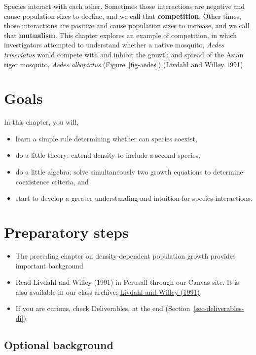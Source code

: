 \documentclass[
  letterpaper,
  DIV=11,
  numbers=noendperiod]{scrreprt}
\providecommand{\tightlist}{%
  \setlength{\itemsep}{0pt}\setlength{\parskip}{0pt}}
\begin{document}
Species interact with each other. Sometimes those interactions are
negative and cause population sizes to decline, and we call that
\textbf{competition}. Other times, those interactions are positive and
cause population sizes to increase, and we call that \textbf{mutualism}.
This chapter explores an example of competition, in which investigators
attempted to understand whether a native mosquito, \emph{Aedes
triseriatus} would compete with and inhibit the growth and spread of the
Asian tiger mosquito, \emph{Aedes albopictus} (Figure~\ref{fig-aedes})
(Livdahl and Willey 1991).

\section{Goals}\label{goals-7}

In this chapter, you will,

\begin{itemize}
\tightlist
\item
  learn a simple rule determining whether can species coexist,
\item
  do a little theory: extend density to include a second species,
\item
  do a little algebra: solve simultaneously two growth equations to
  determine coexistence criteria, and
\item
  start to develop a greater understanding and intuition for species
  interactions.
\end{itemize}

\section{Preparatory steps}\label{preparatory-steps-4}

\begin{itemize}
\tightlist
\item
  The preceding chapter on density-dependent population growth provides
  important background
\item
  Read Livdahl and Willey (1991) in Perusall through our Canvas site. It
  is also available in our class archive:
  \href{https://drive.google.com/drive/folders/1opLlrmF7kfo0FtWwwJ1CbfPWIyuaISC1?usp=sharing}{Livdahl
  and Willey (1991)}
\item
  If you are curious, check Deliverables, at the end
  (Section~\ref{sec-deliverables-di}).
\end{itemize}

\subsection{Optional background}\label{optional-background}
\end{document}
